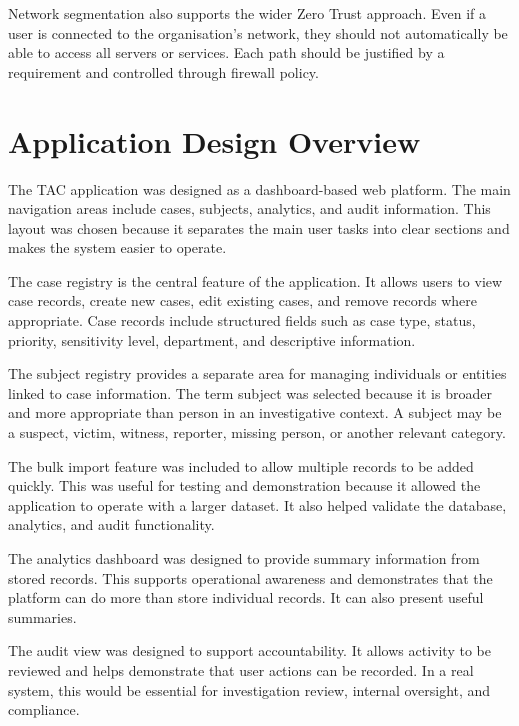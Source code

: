 Network segmentation also supports the wider Zero Trust approach. Even if a user is connected to the organisation's network, they should not automatically be able to access all servers or services. Each path should be justified by a requirement and controlled through firewall policy.


\section{Application Design Overview}

The TAC application was designed as a dashboard-based web platform. The main navigation areas include cases, subjects, analytics, and audit information. This layout was chosen because it separates the main user tasks into clear sections and makes the system easier to operate.

The case registry is the central feature of the application. It allows users to view case records, create new cases, edit existing cases, and remove records where appropriate. Case records include structured fields such as case type, status, priority, sensitivity level, department, and descriptive information.

The subject registry provides a separate area for managing individuals or entities linked to case information. The term subject was selected because it is broader and more appropriate than person in an investigative context. A subject may be a suspect, victim, witness, reporter, missing person, or another relevant category.

The bulk import feature was included to allow multiple records to be added quickly. This was useful for testing and demonstration because it allowed the application to operate with a larger dataset. It also helped validate the database, analytics, and audit functionality.

The analytics dashboard was designed to provide summary information from stored records. This supports operational awareness and demonstrates that the platform can do more than store individual records. It can also present useful summaries.

The audit view was designed to support accountability. It allows activity to be reviewed and helps demonstrate that user actions can be recorded. In a real system, this would be essential for investigation review, internal oversight, and compliance.

